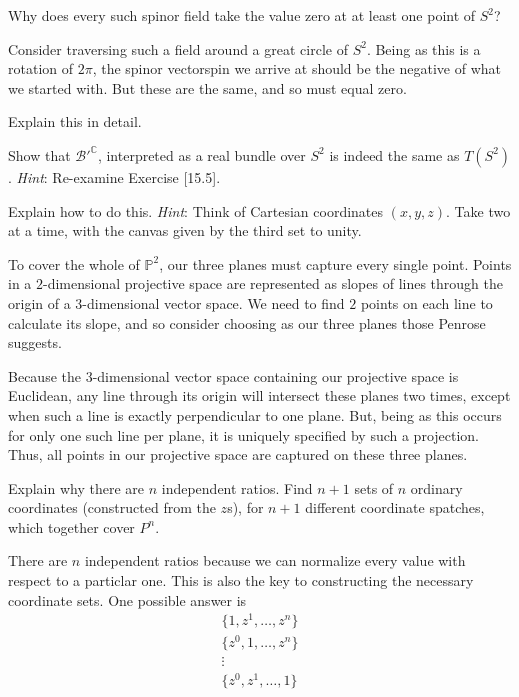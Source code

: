 \documentclass[../the-road-to-reality.tex]{subfiles}
\begin{document}
\begin{questions}
  \question Why does every such spinor field take the value zero at at least one
  point of $S^2$?

  \begin{solution}
    Consider traversing such a field around a great circle of $S^2$. Being as
    this is a rotation of $2\pi$, the spinor vectorspin we arrive at should be the negative
    of what we started with. But these are the same, and so must equal zero.
  \end{solution}

  \question Explain this in detail.

  \question Show that $\mathcal{B}'^{\mathbb{C}}$, interpreted as a real bundle
  over $S^2$ is indeed the same as $T(S^2)$. \textit{Hint}: Re-examine Exercise [15.5].

  \question Explain how to do this. \textit{Hint}: Think of Cartesian
    coordinates $(x,y,z)$. Take two at a time, with the canvas given by the
    third set to unity.

  \begin{solution}
    To cover the whole of $\mathbb{P}^2$, our three planes must capture every
    single point. Points in a $2$-dimensional projective space are represented as slopes of
    lines through the origin of a $3$-dimensional vector space. We need to find
    $2$ points on each line to calculate its slope, and so consider choosing as our
    three planes those Penrose suggests.

    Because the $3$-dimensional vector space containing our projective space is
    Euclidean, any line through its origin will intersect these planes two
    times, except when such a line is exactly perpendicular to one plane. But,
    being as this occurs for only one such line per plane, it is uniquely
    specified by such a projection. Thus, all points in our projective space are
    captured on these three planes.
  \end{solution}

  \question Explain why there are $n$ independent ratios. Find $n+1$ sets of $n$
    ordinary coordinates (constructed from the $z$s), for $n+1$ different
    coordinate spatches, which together cover $P^n$.

    \begin{solution}
      There are $n$ independent ratios because we can normalize every value with
      respect to a particlar one. This is also the key to constructing the
      necessary coordinate sets. One possible answer is
      \begin{gather*}
        \{1, z^1, \dots, z^n\} \\
        \{z^0, 1, \dots, z^n\} \\
        \vdots \\
        \{z^0, z^1, \dots, 1\}
      \end{gather*}
    \end{solution}



\end{questions}
\end{document}
